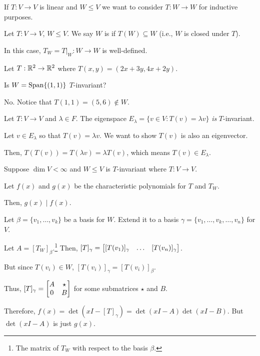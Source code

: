 \documentclass[notes,tikz]{agony}
\begin{document}
If $T : V \to V$ is linear and $W \leq V$ we want to consider
$T : W \to W$ for inductive purposes.
\begin{defn}
  Let $T : V \to V$, $W \leq V$.
  We say $W$ is  if $T(W) \subseteq W$
  (i.e., $W$ is closed under $T$).

  In this case, $T_W = T|_W : W \to W$ is well-defined.
\end{defn}
\begin{example}
  Let $T : \mathbb{R}^2 \to \mathbb{R}^2$ where $T(x,y) = (2x+3y, 4x+2y)$.

  Is $W = \operatorname{Span}\{(1,1)\}$ $T$-invariant?
\end{example}
\begin{sol}
  No. Notice that $T(1,1) = (5,6) \not\in W$.
\end{sol}
\begin{example}
  Let $T : V \to V$ and $\lambda \in F$.
  The eigenspace $E_\lambda = \{v \in V : T(v) = \lambda v\}$
  \emph{is} $T$-invariant.
\end{example}
\begin{prf}
  Let $v \in E_\lambda$ so that $T(v) = \lambda v$.
  We want to show $T(v)$ is also an eigenvector.

  Then, $T(T(v)) = T(\lambda v) = \lambda T(v)$,
  which means $T(v) \in E_\lambda$.
\end{prf}
\begin{prop}
  Suppose $\dim V < \infty$ and $W \leq V$ is $T$-invariant
  where $T : V \to V$.

  Let $f(x)$ and $g(x)$ be the characteristic polynomials for $T$ and $T_W$.

  Then, $g(x) \mid f(x)$.
\end{prop}
\begin{prf}
  Let $\beta = \{v_1,\dotsc,v_k\}$ be a basis for $W$.
  Extend it to a basis $\gamma = \{v_1,\dotsc,v_k,\dotsc,v_n\}$ for $V$.

  Let $A = [T_W]_\beta$.\footnote{The matrix of $T_W$ with respect to the basis $\beta$.}
  Then, $[T]_\gamma = \mqty[{[T(v_1)]_\gamma} & \dots & {[T(v_n)]_\gamma}]$.

  But since $T(v_i) \in W$, $[T(v_i)]_\gamma = [T(v_i)]_\beta$.

  Thus, $[T]_\gamma = \mqty[A & \star \\ 0 & B]$ for some submatrices $\star$ and $B$.

  Therefore, $f(x) = \det(xI - [T]_\gamma) = \det(xI-A)\det(xI-B)$.
  But $\det(xI-A)$ is just $g(x)$.
\end{prf}
\end{document}
